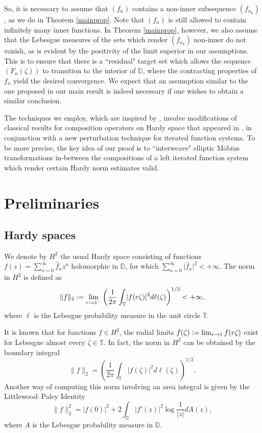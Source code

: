 \documentclass[11pt, reqno]{amsart}
\theoremstyle{definition}
\numberwithin{equation}{section}
\newcommand{\D}{\mathbb{D}}
\newcommand{\T}{\mathbb{T}}
\begin{document}
So, it is necessary to assume that $(f_n)$ contains a non-inner subsequence $(f_{n_k})$, as we do in Theorem \ref{mainprop}. Note that $(f_n)$ is still allowed to contain infinitely many inner functions. In Theorem \ref{mainprop}, however, we also assume that the Lebesgue measures of the sets which render $(f_{n_k})$ non-inner do not vanish, as is evident by the positivity of the limit superior in our assumptions. This is to ensure that there is a ``residual" target set which allows the sequence $(F_n(\zeta))$ to transition to the interior of $\D$, where the contracting properties of $f_n$ yield the desired convergence. We expect that an assumption similar to the one proposed in our main result is indeed necessary if one wishes to obtain a similar conclusion.

The techniques we employ, which are inspired by \cite{BoMaSh2005}, involve modifications of classical results for composition operators on Hardy space that appeared in \cite{Sh2000}, in conjunction with a new perturbation technique for iterated function systems. To be more precise, the key idea of our proof is to ``interweave" elliptic M\"obius transformations in-between the compositions of a left iterated function system which render certain Hardy norm estimates valid. 

\section{Preliminaries}

\subsection{Hardy spaces}
We denote by $H^2$ the usual Hardy space consisting of functions $ f(z)=\sum_{n=0}^{\infty}\widehat{f}_nz^n$ holomorphic in $\D$, for which $\sum_{n=0}^{\infty}\rvert \widehat{f}_n\lvert^2<+\infty$. The norm in $H^2$ is defined as
\begin{equation}\label{eq: hardy norm}
\lVert f \rVert_2\vcentcolon=\lim_{r\to1^-}\left(\frac{1}{2\pi}\int_{\T} \lvert f(r\zeta) \rvert^2 d\ell(\zeta)\right)^{1/2}<+\infty,
\end{equation}
where $\ell$ is the Lebesgue probability measure in the unit circle $\T$.

It is known \cite[Theorem 2.2]{Du1970} that for functions $f\in H^2$, the radial limits $f(\zeta)\vcentcolon=\lim_{r\to1}f(r\zeta)$ exist for Lebesgue almost every $\zeta\in\T$. In fact, the norm in $H^2$ can be obtained by the boundary integral
\begin{equation}\label{eq: hardy norm integral form}
\lVert f \rVert_2=\left(\frac{1}{2\pi}\int_{\T} \lvert f(\zeta) \rvert^2d\ell(\zeta)\right)^{1/2}.
\end{equation}
Another way of computing this norm involving an area integral is given by the Littlewood--Paley Identity \cite[p. 178]{Sh1993}
\begin{equation}\label{L-P}
\lVert f \rVert_2^2 = \lvert f(0) \rvert^2 +2\int_{\D} \lvert f'(z) \rvert^2 \log \frac{1}{\lvert z\rvert} dA(z),
\end{equation}
where $A$ is the Lebesgue probability measure in $\D$.
\end{document}
